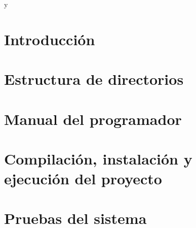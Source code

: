 \cite{wiki:latex} y \cite{koza92}
\section{Introducción}

\section{Estructura de directorios}

\section{Manual del programador}

\section{Compilación, instalación y ejecución del proyecto}

\section{Pruebas del sistema}
